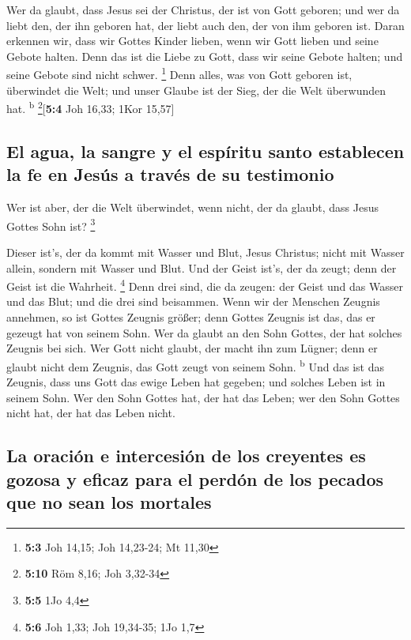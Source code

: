  Wer da glaubt, dass Jesus sei der Christus, der ist von
Gott geboren; und wer da liebt den, der ihn geboren hat, der liebt auch
den, der von ihm geboren ist.  Daran erkennen wir, dass
wir Gottes Kinder lieben, wenn wir Gott lieben und seine Gebote halten.
 Denn das ist die Liebe zu Gott, dass wir seine Gebote
halten; und seine Gebote sind nicht schwer. \footnote{\textbf{5:3} Joh
  14,15; Joh 14,23-24; Mt 11,30}  Denn alles, was von Gott
geboren ist, überwindet die Welt; und unser Glaube ist der Sieg, der die
Welt überwunden hat. \textsuperscript{b} \footnote{\textbf{5:10} Röm
  8,16; Joh 3,32-34}{[}\textbf{5:4} Joh 16,33; 1Kor 15,57{]}

\hypertarget{el-agua-la-sangre-y-el-espuxedritu-santo-establecen-la-fe-en-jesuxfas-a-travuxe9s-de-su-testimonio}{%
\subsection{El agua, la sangre y el espíritu santo establecen la fe en
Jesús a través de su
testimonio}\label{el-agua-la-sangre-y-el-espuxedritu-santo-establecen-la-fe-en-jesuxfas-a-travuxe9s-de-su-testimonio}}

 Wer ist aber, der die Welt überwindet, wenn nicht, der da
glaubt, dass Jesus Gottes Sohn ist? \footnote{\textbf{5:5} 1Jo 4,4}

 Dieser ist's, der da kommt mit Wasser und Blut, Jesus
Christus; nicht mit Wasser allein, sondern mit Wasser und Blut. Und der
Geist ist's, der da zeugt; denn der Geist ist die Wahrheit. \footnote{\textbf{5:6}
  Joh 1,33; Joh 19,34-35; 1Jo 1,7}  Denn drei sind, die da
zeugen: der Geist und das Wasser und das Blut;  und die
drei sind beisammen.  Wenn wir der Menschen Zeugnis
annehmen, so ist Gottes Zeugnis größer; denn Gottes Zeugnis ist das, das
er gezeugt hat von seinem Sohn.  Wer da glaubt an den
Sohn Gottes, der hat solches Zeugnis bei sich. Wer Gott nicht glaubt,
der macht ihn zum Lügner; denn er glaubt nicht dem Zeugnis, das Gott
zeugt von seinem Sohn. \textsuperscript{b}  Und das ist
das Zeugnis, dass uns Gott das ewige Leben hat gegeben; und solches
Leben ist in seinem Sohn.  Wer den Sohn Gottes hat, der
hat das Leben; wer den Sohn Gottes nicht hat, der hat das Leben nicht.

\hypertarget{la-oraciuxf3n-e-intercesiuxf3n-de-los-creyentes-es-gozosa-y-eficaz-para-el-perduxf3n-de-los-pecados-que-no-sean-los-mortales}{%
\subsection{La oración e intercesión de los creyentes es gozosa y eficaz
para el perdón de los pecados que no sean los
mortales}\label{la-oraciuxf3n-e-intercesiuxf3n-de-los-creyentes-es-gozosa-y-eficaz-para-el-perduxf3n-de-los-pecados-que-no-sean-los-mortales}}

